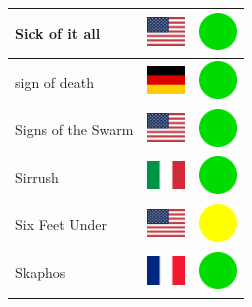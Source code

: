 \documentclass[12pt, a4paper, twoside]{report}
\begin{document}
\begin{center}
\begin{longtable}{|p{5cm}|p{2cm}|p{2cm}|}
 Sick of it all                                             & \includegraphics[width=1cm]{4x3/us} &   \includegraphics[width=1cm]{likes/y} \\ \hline
 sign of death                                              & \includegraphics[width=1cm]{4x3/de} &   \includegraphics[width=1cm]{likes/y} \\ \hline
 Signs of the Swarm                                         & \includegraphics[width=1cm]{4x3/us} &   \includegraphics[width=1cm]{likes/y} \\ \hline
 Sirrush                                                    & \includegraphics[width=1cm]{4x3/it} &   \includegraphics[width=1cm]{likes/y} \\ \hline
 Six Feet Under                                             & \includegraphics[width=1cm]{4x3/us} &   \includegraphics[width=1cm]{likes/m} \\ \hline
 Skaphos                                                    & \includegraphics[width=1cm]{4x3/fr} &   \includegraphics[width=1cm]{likes/y} \\ \hline

\end{longtable}
\end{center}
\end{document}

